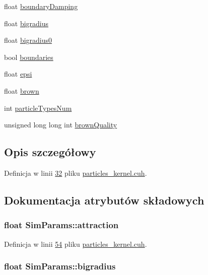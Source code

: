\begin{DoxyCompactItemize}
float \hyperlink{struct_sim_params_a4da0c7593d6569e48ee50e7d0c7576f9}{boundary\-Damping}
\item 
float \hyperlink{struct_sim_params_af41979948fdd8f76fe28ce2b43eb24cd}{bigradius}
\item 
float \hyperlink{struct_sim_params_a5809a1ec819f5a99e350ed28b01834fc}{bigradius0}
\item 
bool \hyperlink{struct_sim_params_a01507f06cc018071a0eb741438aaa09b}{boundaries}
\item 
float \hyperlink{struct_sim_params_a760551182a6dff0b67f3048daa2620fb}{epsi}
\item 
float \hyperlink{struct_sim_params_a88dae34e74c9184adfa9169bad06d0ee}{brown}
\item 
int \hyperlink{struct_sim_params_adc3e5f65a1a0ef7c944007ac99eb8034}{particle\-Types\-Num}
\item 
unsigned long long int \hyperlink{struct_sim_params_a366145dd58e2e7eacebffcbe78dd89ff}{brown\-Quality}
\end{DoxyCompactItemize}


\subsection{Opis szczegółowy}


Definicja w linii \hyperlink{particles__kernel_8cuh_source_l00032}{32} pliku \hyperlink{particles__kernel_8cuh_source}{particles\-\_\-kernel.\-cuh}.



\subsection{Dokumentacja atrybutów składowych}
\hypertarget{struct_sim_params_acf7442ae8a49237861944271cb630d01}{
\subsubsection[{attraction}]{\setlength{\rightskip}{0pt plus 5cm}float Sim\-Params\-::attraction}}\label{struct_sim_params_acf7442ae8a49237861944271cb630d01}


Definicja w linii \hyperlink{particles__kernel_8cuh_source_l00054}{54} pliku \hyperlink{particles__kernel_8cuh_source}{particles\-\_\-kernel.\-cuh}.

\hypertarget{struct_sim_params_af41979948fdd8f76fe28ce2b43eb24cd}{
\subsubsection[{bigradius}]{\setlength{\rightskip}{0pt plus 5cm}float Sim\-Params\-::bigradius}}\label{struct_sim_params_af41979948fdd8f76fe28ce2b43eb24cd}


